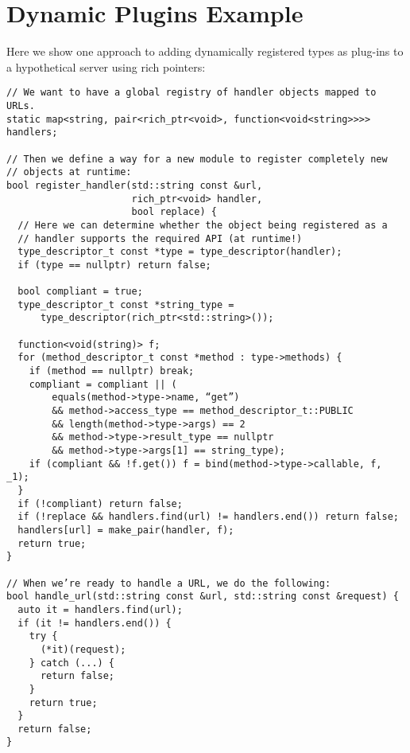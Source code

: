 \section{Dynamic Plugins Example}
\label{appendix:plugins-example}

Here we show one approach to adding dynamically registered types as plug-ins to
a hypothetical server using rich pointers:

\begin{verbatim}
// We want to have a global registry of handler objects mapped to URLs.
static map<string, pair<rich_ptr<void>, function<void<string>>>> handlers;

// Then we define a way for a new module to register completely new
// objects at runtime:
bool register_handler(std::string const &url,
                      rich_ptr<void> handler,
                      bool replace) {
  // Here we can determine whether the object being registered as a
  // handler supports the required API (at runtime!)
  type_descriptor_t const *type = type_descriptor(handler);
  if (type == nullptr) return false;

  bool compliant = true;
  type_descriptor_t const *string_type =
      type_descriptor(rich_ptr<std::string>());

  function<void(string)> f;
  for (method_descriptor_t const *method : type->methods) {
    if (method == nullptr) break;
    compliant = compliant || (
        equals(method->type->name, “get”)
        && method->access_type == method_descriptor_t::PUBLIC
        && length(method->type->args) == 2
        && method->type->result_type == nullptr
        && method->type->args[1] == string_type);
    if (compliant && !f.get()) f = bind(method->type->callable, f, _1);
  }
  if (!compliant) return false;
  if (!replace && handlers.find(url) != handlers.end()) return false;
  handlers[url] = make_pair(handler, f);
  return true;
}

// When we’re ready to handle a URL, we do the following:
bool handle_url(std::string const &url, std::string const &request) {
  auto it = handlers.find(url);
  if (it != handlers.end()) {
    try {
      (*it)(request);
    } catch (...) {
      return false;
    }
    return true;
  }
  return false;
}
\end{verbatim}


